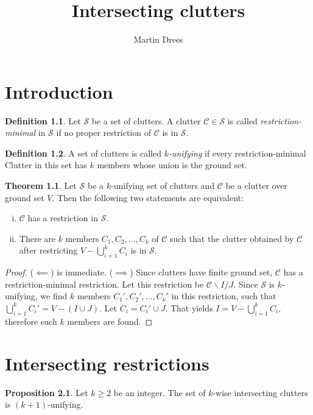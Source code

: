 \documentclass[a4paper, 12pt, twoside=false]{scrbook}
\title{Intersecting clutters}
\author{Martin Drees}
\theoremstyle{definition}
\newtheorem{definition}{Definition}
\newtheorem{theorem}{Theorem}[section]
\newtheorem{proposition}{Proposition}
\begin{document}
   \maketitle
   \tableofcontents
   \chapter{Introduction}
   \begin{definition}
       Let $\mathcal{S}$ be a set of clutters.
       A clutter $\mathcal{C} \in \mathcal{S}$ is called \emph{restriction-minimal} in $\mathcal{S}$ if no proper restriction of $\mathcal{C}$ is in $\mathcal{S}$.
   \end{definition}

   \begin{definition}
       A set of clutters is called \emph{$k$-unifying} if every restriction-minimal Clutter in this set has $k$ members whose union is the ground set.
   \end{definition}

   \begin{theorem}
       Let $\mathcal{S}$ be a $k$-unifying set of clutters and $\mathcal{C}$ be a clutter over ground set $V$.
       Then the following two statements are equivalent:
       \leavevmode
       \begin{enumerate}[i)]
           \item $\mathcal{C}$ has a restriction in $\mathcal{S}$.
           \item There are $k$ members $C_1, C_2, \ldots, C_k$ of $\mathcal{C}$ such that the clutter obtained by $\mathcal{C}$ after restricting $V - \bigcup_{i=1}^k C_i$ is in $\mathcal{S}$.
       \end{enumerate}
   \end{theorem}

   \begin{proof}
       ($\impliedby$) is immediate.
       ($\implies$) Since clutters have finite ground set, $\mathcal{C}$ has a restriction-minimal restriction.
       Let this restriction be $\mathcal{C}\backslash I / J$.
       Since $\mathcal{S}$ is $k$-unifying, we find $k$ members $C_1', C_2', \ldots, C_k'$ in this restriction, such that $\bigcup_{i=1}^k C_i' = V - (I \cup J)$.
 Let $C_i = C_i' \cup J$.
       That yields $I=V-\bigcup_{i=1}^k C_i$, therefore such $k$ members are found.
   \end{proof}

   \chapter{Intersecting restrictions}
   \begin{proposition}
       Let $k\geq 2$ be an integer.
       The set of $k$-wise intersecting clutters is $(k+1)$-unifying.
   \end{proposition}
\end{document}
